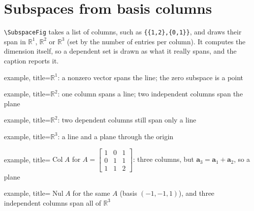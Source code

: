 \documentclass[11pt]{article}
\begin{document}
\section*{Subspaces from basis columns}

\verb|\SubspaceFig| takes a list of columns, such as \verb|{{1,2},{0,1}}|,
and draws their span in $\mathbb{R}^1$, $\mathbb{R}^2$ or $\mathbb{R}^3$
(set by the number of entries per column). It computes the dimension
itself, so a dependent set is drawn as what it really spans, and the
caption reports it.

\begin{tcblisting}{example, title={$\mathbb{R}^1$: a nonzero vector spans
    the line; the zero subspace is a point}}
\qquad
\SubspaceFig[ambient=1]{}
\end{tcblisting}

\begin{tcblisting}{example, title={$\mathbb{R}^2$: one column spans a
    line; two independent columns span the plane}}
\quad
{}
\end{tcblisting}

\begin{tcblisting}{example, title={$\mathbb{R}^2$: two dependent columns
    still span only a line}}
\end{tcblisting}

\begin{tcblisting}{example, title={$\mathbb{R}^3$: a line and a plane
    through the origin}}
\quad
{}
\end{tcblisting}

\begin{tcblisting}{example, title={$\operatorname{Col} A$ for
    $A = \left[\begin{smallmatrix} 1&0&1\\ 0&1&1\\ 1&1&2
    \end{smallmatrix}\right]$: three columns, but
    $\mathbf{a}_3 = \mathbf{a}_1 + \mathbf{a}_2$, so a plane}}
\end{tcblisting}

\begin{tcblisting}{example, title={$\operatorname{Nul} A$ for the same
    $A$ (basis $(-1,-1,1)$), and three independent columns span all of
    $\mathbb{R}^3$}}
\quad
{}
\end{tcblisting}
\end{document}
